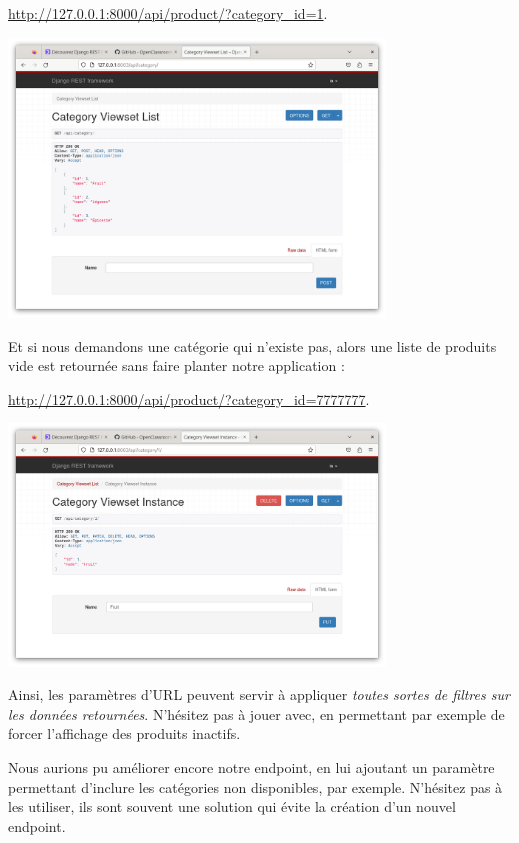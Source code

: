 \begin{center}
\url{http://127.0.0.1:8000/api/product/?category_id=1}.
\end{center}
\begin{center}
\includegraphics[width=10cm]{images/image09.png}
\end{center}
Et si nous demandons une catégorie qui n'existe pas, alors une liste de produits vide est retournée sans faire planter notre application :
\begin{center}
\url{http://127.0.0.1:8000/api/product/?category_id=7777777}.
\end{center}
\begin{center}
\includegraphics[width=10cm]{images/image10.png}
\end{center}

Ainsi, les paramètres d’URL peuvent servir à appliquer {\em toutes sortes de filtres sur les données retournées}. N’hésitez pas à jouer avec, en permettant par exemple de forcer l’affichage des produits inactifs.
\begin{theorem}
Nous aurions pu améliorer encore notre endpoint, en lui ajoutant un paramètre permettant d’inclure les catégories non disponibles, par exemple. N’hésitez pas à les utiliser, ils sont souvent une solution qui évite la création d’un nouvel endpoint.
\end{theorem}

